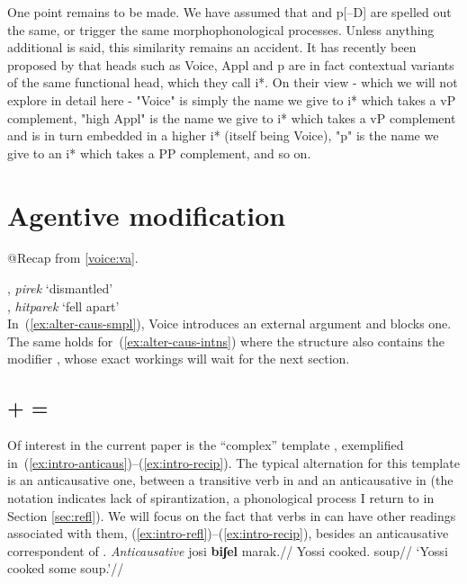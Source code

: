 One point remains to be made. We have assumed that {\vz} and p[--D] are spelled out the same, or trigger the same morphophonological processes. Unless anything additional is said, this similarity remains an accident. It has recently been proposed by \cite{woodmarantz17} that heads such as Voice, Appl and p are in fact contextual variants of the same functional head, which they call i*. On their view - which we will not explore in detail here - "Voice" is simply the name we give to i* which takes a vP complement, "high Appl" is the name we give to i* which takes a vP complement and is in turn embedded in a higher i* (itself being Voice), "p" is the name we give to an i* which takes a PP complement, and so on.




\section{Agentive modification} \label{vz:va}
@Recap {\va} from \ref{voice:va}.

\pex \label{ex:alter-caus-intns}
	\a {\tpie}, \emph{pirek} `dismantled'\\
	\a {\thit}, \emph{hitparek} `fell apart'\\
\xe
In~(\ref{ex:alter-caus-smpl}), Voice introduces an external argument and {\vz} blocks one. The same holds for~(\ref{ex:alter-caus-intns}) where the structure also contains the modifier {\va}, whose exact workings will wait for the next section.

	\subsection{\vz + {\va} = \thit}
Of interest in the current paper is the ``complex'' template {\thit}, exemplified in~(\ref{ex:intro-anticaus})--(\ref{ex:intro-recip}). The typical alternation for this template is an anticausative one, between a transitive verb in {\tpie} and an anticausative in {\thit} (the notation  indicates lack of spirantization, a phonological process I return to in Section \ref{sec:refl}). We will focus on the fact that verbs in {\thit} can have other readings associated with them, (\ref{ex:intro-refl})--(\ref{ex:intro-recip}), besides an anticausative correspondent of {\tpie}.
\pex\label{ex:intro-anticaus}\textit{Anticausative}
	\a \begingl
		\gla josi \textbf{biʃel} marak.//
		\glb Yossi cooked. soup//
		\glft `Yossi cooked some soup.'//
	\endgl
	
